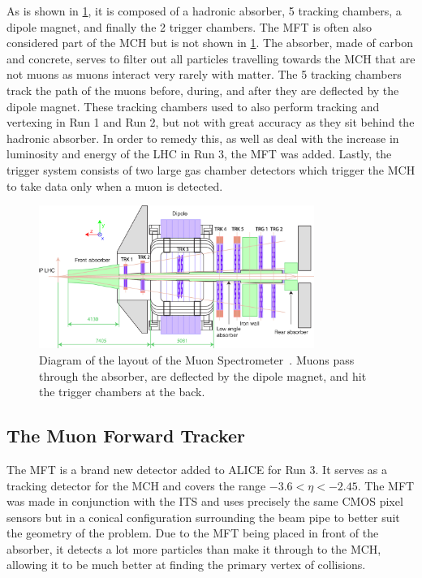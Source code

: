 As is shown in \cref{fig:Muon Spectrometer}, it is composed of a hadronic absorber, 5 tracking chambers, a dipole magnet, and finally the 2 trigger chambers. The MFT is often also considered part of the MCH but is not shown in \cref{fig:Muon Spectrometer}. The absorber, made of carbon and concrete, serves to filter out all particles travelling towards the MCH that are not muons as muons interact very rarely with matter. The 5 tracking chambers track the path of the muons before, during, and after they are deflected by the dipole magnet. These tracking chambers used to also perform tracking and vertexing in Run 1 and Run 2, but not with great accuracy as they sit behind the hadronic absorber. In order to remedy this, as well as deal with the increase in luminosity and energy of the LHC in Run 3, the MFT was added. Lastly, the trigger system consists of two large gas chamber detectors which trigger the MCH to take data only when a muon is detected.

\begin{figure}[h]
    \begin{center}
        \includegraphics[width=0.8\textwidth]{Figs/MCH_schematic_pog.png}
        \caption{Diagram of the layout of the Muon Spectrometer~\cite{Muon_Spec_Schematic}. Muons pass through the absorber, are deflected by the dipole magnet, and hit the trigger chambers at the back.}
        \label{fig:Muon Spectrometer}
    \end{center}
\end{figure}

\subsection{The Muon Forward Tracker}
The MFT is a brand new detector added to ALICE for Run 3. It serves as a tracking detector for the MCH and covers the range $-3.6<\eta<-2.45$. The MFT was made in conjunction with the ITS and uses precisely the same CMOS pixel sensors but in a conical configuration surrounding the beam pipe to better suit the geometry of the problem. Due to the MFT being placed in front of the absorber, it detects a lot more particles than make it through to the MCH, allowing it to be much better at finding the primary vertex of collisions.

